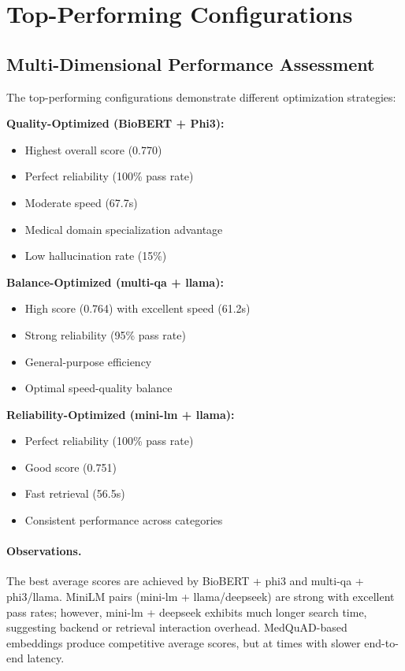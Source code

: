 \section{Top-Performing Configurations}



\subsection{Multi-Dimensional Performance Assessment}

The top-performing configurations demonstrate different optimization strategies:

\textbf{Quality-Optimized (BioBERT + Phi3):}
\begin{itemize}
    \item Highest overall score (0.770)
    \item Perfect reliability (100\% pass rate)
    \item Moderate speed (67.7s)
    \item Medical domain specialization advantage
    \item Low hallucination rate (15\%)
\end{itemize}

\textbf{Balance-Optimized (multi-qa + llama):}
\begin{itemize}
    \item High score (0.764) with excellent speed (61.2s)
    \item Strong reliability (95\% pass rate)
    \item General-purpose efficiency
    \item Optimal speed-quality balance
\end{itemize}

\textbf{Reliability-Optimized (mini-lm + llama):}
\begin{itemize}
    \item Perfect reliability (100\% pass rate)
    \item Good score (0.751)
    \item Fast retrieval (56.5s)
    \item Consistent performance across categories
\end{itemize}

\paragraph{Observations.} The best average scores are achieved by BioBERT + phi3 and multi-qa + phi3/llama. MiniLM pairs (mini-lm + llama/deepseek) are strong with excellent pass rates; however, mini-lm + deepseek exhibits much longer search time, suggesting backend or retrieval interaction overhead. MedQuAD-based embeddings produce competitive average scores, but at times with slower end-to-end latency.

